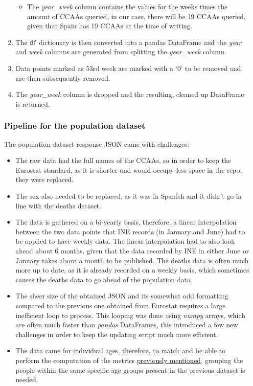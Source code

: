 \documentclass[
  a4paper]{article}
\providecommand{\tightlist}{%
  \setlength{\itemsep}{0pt}\setlength{\parskip}{0pt}}
\begin{document}
\begin{enumerate}
  \begin{itemize}
  \tightlist
  \item
    The \emph{year\_week} column contains the values for the weeks times
    the amount of CCAAs queried, in our case, there will be 19 CCAAs
    queried, given that Spain has 19 CCAAs at the time of writing.
  \end{itemize}
\item
  The \texttt{df} dictionary is then converted into a pandas DataFrame
  and the \emph{year} and \emph{week} columns are generated from
  splitting the \emph{year\_week} column.
\item
  Data points marked as 53rd week are marked with a `0' to be removed
  and are then subsequently removed.
\item
  The \emph{year\_week} column is dropped and the resulting, cleaned up
  DataFrame is returned.
\end{enumerate}

\hypertarget{PopDatasetPipeline}{%
\subsubsection{Pipeline for the population
dataset}\label{PopDatasetPipeline}}

The population dataset response JSON came with challenges:

\begin{itemize}
\item
  The raw data had the full names of the CCAAs, so in order to keep the
  Eurostat standard, as it is shorter and would occupy less space in the
  repo, they were replaced.
\item
  The sex also needed to be replaced, as it was in Spanish and it didn't
  go in line with the deaths dataset.
\item
  The data is gathered on a bi-yearly basis, therefore, a linear
  interpolation between the two data points that INE records (in January
  and June) had to be applied to have weekly data. The linear
  interpolation had to also look ahead about 6 months, given that the
  data recorded by INE in either June or January takes about a month to
  be published. The deaths data is often much more up to date, as it is
  already recorded on a weekly basis, which sometimes causes the deaths
  data to go ahead of the population data.
\item
  The sheer size of the obtained JSON and its somewhat odd formatting
  compared to the previous one obtained from Eurostat requires a large
  inefficient loop to process. This looping was done using \emph{numpy}
  arrays, which are often much faster than \emph{pandas} DataFrames,
  this introduced a few new challenges in order to keep the updating
  script much more efficient.
\item
  The data came for individual ages, therefore, to match and be able to
  perform the computation of the metrics
  \protect\hyperlink{Metrics}{previously mentioned}, grouping the people
  within the same specific age groups present in the previous dataset is
  needed.
\end{itemize}
\end{document}
